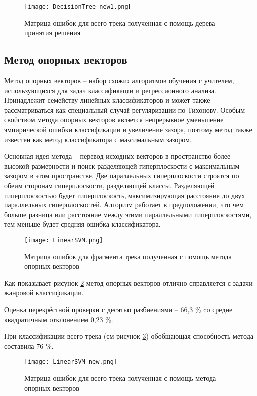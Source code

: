 \begin{figure}[h]
\centering
  \texttt{[image: DecisionTree\_new1.png]}
  \caption{Матрица ошибок для всего трека  полученная с помощь дерева принятия решения}
  \label{fig:results:DecisionTree1}
\end{figure}


\subsection{Метод опорных векторов}

Метод опорных векторов --  набор схожих алгоритмов обучения с учителем, использующихся для задач классификации и регрессионного анализа. Принадлежит семейству линейных классификаторов и может также рассматриваться как специальный случай регуляризации по Тихонову. Особым свойством метода опорных векторов является непрерывное уменьшение эмпирической ошибки классификации и увеличение зазора, поэтому метод также известен как метод классификатора с максимальным зазором.

Основная идея метода -- перевод исходных векторов в пространство более высокой размерности и поиск разделяющей гиперплоскости с максимальным зазором в этом пространстве. Две параллельных гиперплоскости строятся по обеим сторонам гиперплоскости, разделяющей классы. Разделяющей гиперплоскостью будет гиперплоскость, максимизирующая расстояние до двух параллельных гиперплоскостей. Алгоритм работает в предположении, что чем больше разница или расстояние между этими параллельными гиперплоскостями, тем меньше будет средняя ошибка классификатора.

\begin{figure}[h]
\centering
  \texttt{[image: LinearSVM.png]}
  \caption{Матрица ошибок для фрагмента трека   полученная с помощь метода опорных векторов}
  \label{fig:results:LinearSVM}
\end{figure}

Как показывает рисунок \ref{fig:results:LinearSVM} метод опорных векторов отлично справляется с задачи жанровой классификации. 


Оценка перекрёстной проверки с десятью разбиениями -- 66,3 \% cо средне квадратичным отклонением 0,23 \%.  

При классификации всего трека (см рисунок \ref{fig:results:LinearSVM_new}) обобщающая способность метода составила 76 \%. 

\begin{figure}[h]
\centering
  \texttt{[image: LinearSVM\_new.png]}
  \caption{Матрица ошибок  для всего трека полученная с помощь метода опорных векторов}
  \label{fig:results:LinearSVM_new}
\end{figure}


